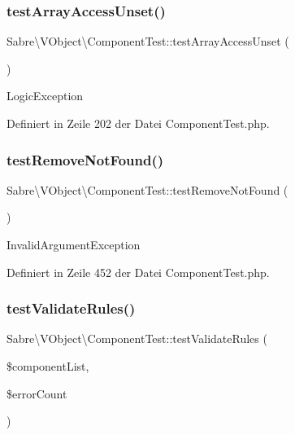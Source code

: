 \subsubsection{\texorpdfstring{test\+Array\+Access\+Unset()}{testArrayAccessUnset()}}
{\footnotesize\ttfamily Sabre\textbackslash{}\+V\+Object\textbackslash{}\+Component\+Test\+::test\+Array\+Access\+Unset (\begin{DoxyParamCaption}{ }\end{DoxyParamCaption})}

Logic\+Exception 

Definiert in Zeile 202 der Datei Component\+Test.\+php.

\mbox{\label{class_sabre_1_1_v_object_1_1_component_test_adef0947fc4df6f9308f1705ccdfbfa51}} 
\subsubsection{\texorpdfstring{test\+Remove\+Not\+Found()}{testRemoveNotFound()}}
{\footnotesize\ttfamily Sabre\textbackslash{}\+V\+Object\textbackslash{}\+Component\+Test\+::test\+Remove\+Not\+Found (\begin{DoxyParamCaption}{ }\end{DoxyParamCaption})}

Invalid\+Argument\+Exception 

Definiert in Zeile 452 der Datei Component\+Test.\+php.

\mbox{\label{class_sabre_1_1_v_object_1_1_component_test_af9315fddf7d3b1820121005c7ee29873}} 
\subsubsection{\texorpdfstring{test\+Validate\+Rules()}{testValidateRules()}}
{\footnotesize\ttfamily Sabre\textbackslash{}\+V\+Object\textbackslash{}\+Component\+Test\+::test\+Validate\+Rules (\begin{DoxyParamCaption}\item[{}]{\$component\+List,  }\item[{}]{\$error\+Count }\end{DoxyParamCaption})}

